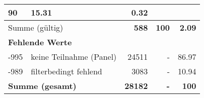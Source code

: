 \begin{longtable}{lXrrr}
       \num{90} &
       \num[round-mode=places,round-precision=2]{15.31} &
         \num[round-mode=places,round-precision=2]{0.32} \\
     \midrule
     \multicolumn{2}{l}{Summe (gültig)} &
       \textbf{\num{588}} &
     \textbf{100} &
       \textbf{\num[round-mode=places,round-precision=2]{2.09}} \\
     \multicolumn{5}{l}{\textbf{Fehlende Werte}}\\
       -995 &
       keine Teilnahme (Panel) &
         \num{24511} &
        - &
         \num[round-mode=places,round-precision=2]{86.97} \\
       -989 &
       filterbedingt fehlend &
         \num{3083} &
        - &
         \num[round-mode=places,round-precision=2]{10.94} \\
     \midrule
     \multicolumn{2}{l}{\textbf{Summe (gesamt)}} &
          \textbf{\num{28182}} &
        \textbf{-} &
        \textbf{100} \\
     \bottomrule
     \end{longtable}
     
